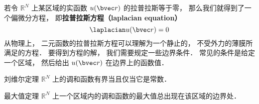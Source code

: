 

若令 $\mathbb R^N$ 上某区域的实函数 $u(\bvec r)$ 的拉普拉斯等于零， 那么我们就得到了一个偏微分方程， 即\textbf{拉普拉斯方程（laplacian equation）}
\begin{equation}
\laplacian u(\bvec r) = 0
\end{equation}
从物理上， 二元函数的拉普拉斯方程可以理解为一个静止的， 不受外力的薄膜所满足的方程． 要得到方程的解， 我们需要规定一些边界条件． 常见的条件是给定一个区域， 然后给出 $u(\bvec r)$ 在边界上的函数值．

\begin{theorem}{刘维尔定理}
$\mathbb R^N$ 上的调和函数有界当且仅当它是常数．
\end{theorem}

\begin{theorem}{最大值定理}
$\mathbb R^N$ 上一个区域内的调和函数的最大值总出现在该区域的边界处．
\end{theorem}
